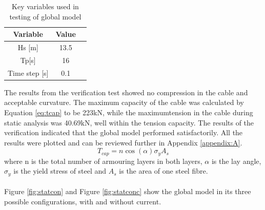 \begin{table} [H]
\centering
\begin{tabular}{ |c|c|c|}
\hline
Variable & Value \\
 \hline
 \hline
Hs [m] & 13.5\\
Tp[s] & 16 \\
Time step [s] & 0.1 \\
 \hline
\end{tabular}
\caption{Key variables used in testing of global model}
\label{table:testglob}
\end{table}
The results from the verification test showed no compression in the cable and acceptable curvature. The maximum capacity of the cable was calculated by Equation \ref{eq:tcap} to be 223kN, while the maximumtension in the cable during static analysis was 40.69kN, well within the tension capacity.
The results of the verification indicated that the global model performed satisfactorily. All the results were plotted and can be reviewed further in Appendix \ref{appendix:A}.
\begin{equation}
    T_{cap}=n \cos{(\alpha)} \sigma_y A_s
   \label{eq:tcap}
\end{equation}
where n is the total number of armouring layers in both layers, $\alpha$ is the lay angle, $\sigma_y$ is the yield stress of steel and $A_s$ is the area of one steel fibre.\\\\ 
 Figure \ref{fig:statcon} and Figure \ref{fig:statconc} show the global model in its three possible configurations, with and without current. 

